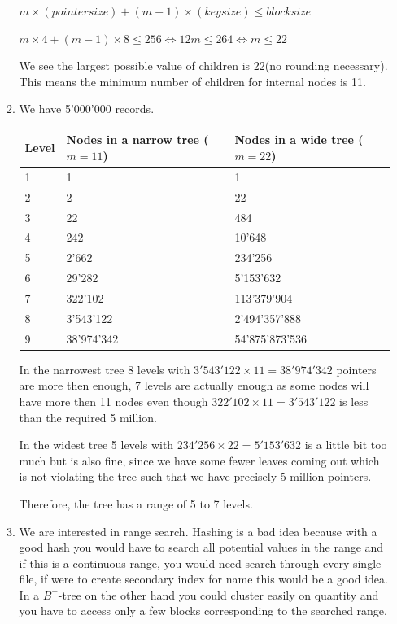 \documentclass[12pt]{extarticle}
\begin{document}
\begin{flushleft}
\begin{enumerate}[label=\textbf{\Alph*.}]
\begin{enumerate}[label=\arabic*)]
$ m \times (pointer size) + (m-1) \times (key size)\leq block size$

$m \times 4+ (m-1) \times 8 \leq 256 \Leftrightarrow 12m\leq264\Leftrightarrow m\leq 22$

We see the largest possible value of children is 22(no rounding necessary). This means the minimum number of children for internal nodes is 11. 
\item 
We have 5'000'000 records. 

\begin{tabular}{lll}
\hline
Level & Nodes in a narrow tree (\(m=11\))& Nodes in a wide tree (\(m=22\))\\
\hline
1     & 1          & 1          \\
2     & 2          & 22         \\
3     & 22         & 484        \\
4     & 242        & 10'648     \\
5     & 2'662      & 234'256    \\
6     & 29'282     & 5'153'632\\
7     & 322'102    & 113'379'904\\
8     & 3'543'122  & 2'494'357'888\\
9	& 38'974'342&54'875'873'536\\
\hline
\end{tabular}

In the narrowest tree 8 levels with $3'543'122\times 11=38'974'342$ pointers are more then enough, 7 levels are actually enough as some nodes will have more then 11 nodes even though $ 322'102\times 11 = 3'543'122$ is less than the required 5 million. 

In the widest tree 5 levels with $234'256 \times 22=5'153'632$ is a little bit too much but is also fine, since we have some fewer leaves coming out which is not violating the tree such that we have precisely 5 million pointers.  

Therefore, the tree has a range of 5 to 7 levels.
\item We are interested in range search. Hashing is a bad idea because with a good hash you would have to search all potential values in the range and if this is a continuous range, you would need search through every single file, if were to create secondary index for name this would be a good idea. In a $B^+$-tree on the other hand you could cluster easily on quantity and you have to access only a few blocks corresponding to the searched range. 


\end{enumerate}
\end{enumerate}
\end{flushleft}
\end{document}
